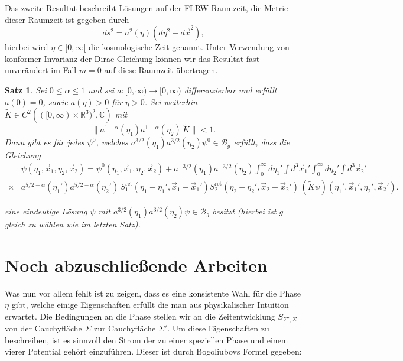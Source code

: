 \documentclass[a4paper,12pt]{article}
\newtheorem{satz}{Satz}
\begin{document}
Das zweite Resultat beschreibt Lösungen auf der FLRW Raumzeit, die Metric dieser Raumzeit ist gegeben durch 
\begin{equation}
ds^2=a^2(\eta) (d\eta^2-d\vec{x}^2),
\end{equation}
hierbei wird \(\eta\in[0,\infty[\) die kosmologische Zeit genannt. Unter Verwendung von konformer Invarianz der Dirac Gleichung
können wir das Resultat fast unverändert im Fall \(m=0\) auf diese Raumzeit übertragen. 

\begin{satz}
	Sei $0 \leq \alpha \leq 1$ und sei $a : [0,\infty) \rightarrow [0,\infty)$ differenzierbar und erfüllt $a(0)=0$, sowie $a(\eta) >0$ für $\eta>0$. 
	Sei weiterhin $\widetilde{K} \in C^2 \left( ([0,\infty)\times \mathbb{R}^3)^2,\mathbb{C}\right)$ mit
	\begin{equation}
		\| a^{1-\alpha}(\eta_1) a^{1-\alpha}(\eta_2) \, \widetilde{K} \| <1.
	\label{eq:ktildecondition}
	\end{equation}
Dann gibt es für jedes $\psi^0$, welches  $a^{3/2}(\eta_1) a^{3/2}(\eta_2) \psi^0 \in \mathscr{B}_g$ erfüllt, dass die Gleichung 
\begin{align}
	&\psi(\eta_1,\vec{x}_1,\eta_2,\vec{x}_2) = \psi^0(\eta_1,\vec{x}_1,\eta_2,\vec{x}_2) + a^{-3/2}(\eta_1) a^{-3/2}(\eta_2) \int_0^\infty d \eta_1' \int d^3 \vec{x}_1' \int_0^\infty d \eta_2' \int d^3 \vec{x}_2'\nonumber\\
	\times &a^{5/2-\alpha}(\eta_1') a^{5/2-\alpha}(\eta_2') \, S_1^\text{ret}(\eta_1-\eta_1', \vec{x}_1-\vec{x}_1') S_2^\text{ret}(\eta_2-\eta_2',\vec{x}_2-\vec{x}_2') \, (\widetilde{K} \psi)(\eta_1',\vec{x}_1',\eta_2',\vec{x}_2').
\end{align}

eine eindeutige Lösung $\psi$ mit $a^{3/2}(\eta_1) a^{3/2}(\eta_2)\psi \in \mathscr{B}_g$ besitzt (hierbei ist \(g\) gleich zu wählen wie im letzten Satz).
\end{satz}








\section{Noch abzuschließende Arbeiten}
Was nun vor allem fehlt ist zu zeigen, dass es eine konsistente Wahl für die Phase \(\eta\) gibt, welche
einige Eigenschaften erfüllt die man aus physikalischer Intuition
erwartet. Die Bedingungen an die Phase
stellen wir an die Zeitentwicklung \(S_{\Sigma',\Sigma}\) von der Cauchyfläche
 \(\Sigma\) zur Cauchyfläche \(\Sigma'\). 
Um diese Eigenschaften zu beschreiben, ist es sinnvoll den Strom der zu einer speziellen Phase
und einem vierer Potential gehört einzuführen. Dieser ist durch Bogoliubovs Formel gegeben:
\end{document}
